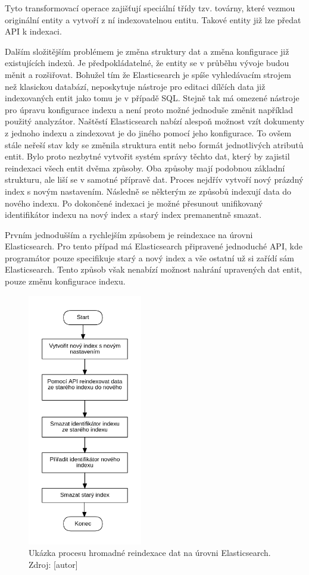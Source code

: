 		Tyto transformovací operace zajišťují speciální třídy tzv. továrny, které vezmou originální entity a vytvoří
		z ní indexovatelnou entitu.
		Takové entity již lze předat \ac{API} k indexaci.

		Dalším složitějším problémem je změna struktury dat a změna konfigurace již existujících indexů.
		Je předpokládatelné, že entity se v průběhu vývoje budou měnit a rozšiřovat.
		Bohužel tím že Elasticsearch je spíše vyhledávacím strojem než klasickou databází, neposkytuje nástroje pro editaci
		dílčích data již indexovaných entit jako tomu je v případě \ac{SQL}.
		Stejně tak má omezené nástroje pro úpravu konfigurace indexu a není proto možné jednoduše změnit například
		použitý analyzátor.
		Naštěstí Elasticsearch nabízí alespoň možnost vzít dokumenty z jednoho indexu a zindexovat je do jiného pomocí jeho
		konfigurace.
		To ovšem stále neřeší stav kdy se změnila struktura entit nebo formát jednotlivých atributů entit.
		Bylo proto nezbytné vytvořit systém správy těchto dat, který by zajistil reindexaci všech entit dvěma způsoby.
		Oba způsoby mají podobnou základní strukturu, ale liší se v samotné přípravě dat.
		Proces nejdřív vytvoří nový prázdný index s novým nastavením.
		Následně se některým ze způsobů indexují data do nového indexu.
		Po dokončené indexaci je možné přesunout unifikovaný identifikátor indexu na nový index a starý index premanentně
		smazat.

		Prvním jednodušším a rychlejším způsobem je reindexace na úrovni Elasticsearch.
		Pro tento případ má Elasticsearch připravené jednoduché \ac{API}, kde programátor pouze specifikuje starý a nový
		index a vše ostatní už si zařídí sám Elasticsearch.
		Tento způsob však nenabízí možnost nahrání upravených dat entit, pouze změnu konfigurace indexu.

		\begin{figure}[H]
			\centering
			\includegraphics[width=5cm]{obrazky/proces_reindexace_na_urovni_es}\hfill
			\caption{Ukázka procesu hromadné reindexace dat na úrovni Elasticsearch. Zdroj: [autor]}
		\end{figure}


